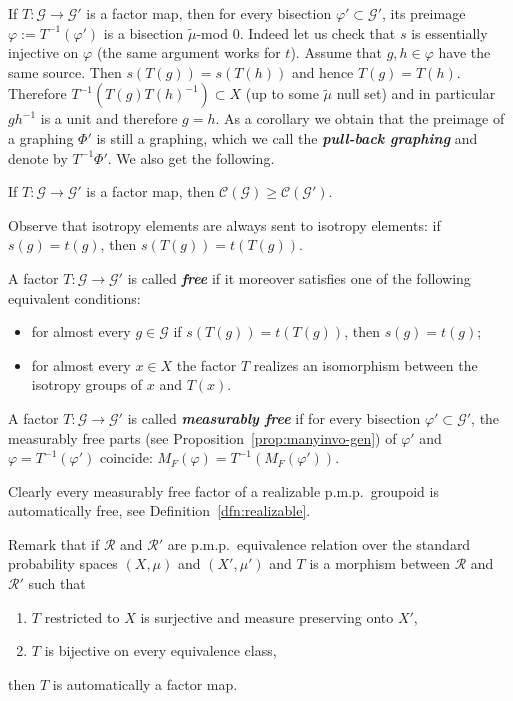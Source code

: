 \documentclass[AHL,Unicode,longabstracts,published]{cedram}
\newcommand{\defin}[1]{\textbf{\emph{#1}}}
\newcommand{\RR}{\mathcal{R}}
\newcommand{\cost}{\mathcal{C}}
\newcommand{\cg}{\mathcal{G}}
\newcommand{\ph}{\varphi}
\newcommand{\pmp}{p.m.p.\ }
\newcommand*{\alphenumi}{\renewcommand*{\theenumi}{\alph{enumi}}}
\begin{document}
If $T:\cg\rightarrow \cg'$ is a factor map, then for every bisection $\ph'\subset \cg'$, its preimage $\ph:=T^{-1}(\ph')$ is a bisection $\widetilde{\mu}$-mod $0$. Indeed let us check that $s$ is essentially injective on $\ph$ (the same argument works for $t$). Assume that $g,h\in \ph$ have the same source. Then $s(T(g))=s(T(h))$ and hence $T(g)=T(h)$. Therefore $T^{-1}(T(g)T(h)^{-1})\subset X$ (up to some $\widetilde{\mu}$ null set) and in particular $gh^{-1}$ is a unit and therefore $g=h$. As a corollary we obtain that the preimage of a graphing $\Phi'$ is still a graphing, which we call the
\defin{pull-back graphing} and denote by $T^{-1} \Phi'$. We also get the following.

\begin{prop}
If $T:\cg\rightarrow \cg'$ is a factor map, then $\cost(\cg)\geq\cost(\cg')$.
\end{prop}

Observe that isotropy elements are always sent to isotropy elements: if $s(g)=t(g)$, then $s(T(g))=t(T(g))$.

A factor $T:\cg\rightarrow\cg'$ is called
\defin{free} if it moreover satisfies one of the following equivalent conditions:
\begin{itemize}
\item for almost every $g\in\cg$ if $s(T(g))=t(T(g))$, then $s(g)=t(g)$;
\item for almost every $x\in X$ the factor $T$ realizes an isomorphism between the isotropy groups of $x$ and $T(x)$.
\end{itemize}

A factor $T:\cg\rightarrow\cg'$ is called
\defin{measurably free} if for every bisection $\ph'\subset \cg'$, the measurably free parts (see Proposition~\ref{prop:manyinvo-gen}) of $\ph'$ and $\ph=T^{-1}(\ph')$ coincide: $M_F(\ph)=T^{-1}(M_F(\ph'))$.

Clearly every measurably free factor of a realizable \pmp groupoid is automatically free, see Definition~\ref{dfn:realizable}.

Remark that if $\RR$ and $\RR'$ are \pmp equivalence relation over the standard probability spaces $(X,\mu)$ and $(X',\mu')$ and $T$ is a morphism between $\RR$ and $\RR'$ such that
\begin{enumerate}\alphenumi
\item $T$ restricted to $X$ is surjective and measure preserving onto $X'$,
\item $T$ is bijective on every equivalence class,
\end{enumerate}
then $T$ is automatically a factor map.
\end{document}
